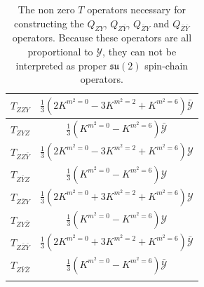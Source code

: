 \begin{table}
%
\begin{center}
%
\begingroup
\setlength{\tabcolsep}{7pt} %
\renewcommand{\arraystretch}{2.0} %
%
\begin{tabular}{ !{\vrule width 1.5pt}c!{\vrule width 1.5pt}c!{\vrule width 1.5pt} }
 	$T_{ZZY}$ & $\frac{1}{3} \left( 2 K^{m^2 = 0} - 3 K^{m^2 = 2} + K^{m^2 = 6} \right) \bar{\mathcal{Y}}$ \\
	\hline 	
 	$T_{ZYZ}$ & $\frac{1}{3} \left( K^{m^2=0} - K^{m^2=6} \right) \bar{\mathcal{Y}}$ \\
 	\hline
 	$T_{ZZ\bar{Y}}$ & $\frac{1}{3} \left( 2 K^{m^2 = 0} - 3 K^{m^2 = 2} + K^{m^2 = 6} \right) \mathcal{Y}$ \\
	\hline 	
 	$T_{Z \bar{Y} Z}$ & $\frac{1}{3} \left( K^{m^2=0} - K^{m^2=6} \right) \mathcal{Y}$ \\
 	\hline
 	$T_{Z\bar{Z}Y}$ & $\frac{1}{3} \left( 2 K^{m^2 = 0} + 3 K^{m^2 = 2} + K^{m^2 = 6} \right) \mathcal{Y}$ \\
	\hline 	
 	$T_{Z Y\bar{Z}}$ & $\frac{1}{3} \left( K^{m^2=0} - K^{m^2=6} \right) \mathcal{Y}$ \\
 	\hline
 	$T_{Z\bar{Z}\bar{Y}}$ & $\frac{1}{3} \left( 2 K^{m^2 = 0} + 3 K^{m^2 = 2} + K^{m^2 = 6} \right) \bar{\mathcal{Y}}$ \\
 	\hline
 	$T_{Z \bar{Y}\bar{Z}}$ & $\frac{1}{3} \left( K^{m^2=0} - K^{m^2=6} \right) \bar{\mathcal{Y}}$ \\
\end{tabular}
%
\endgroup
%
\end{center}
%
\caption[$T$ operators necessary for constructing $Q_{ZY}$, $Q_{Z \bar{Y}}$, $Q_{\bar{Z} Y}$ and $Q_{\bar{Z} \bar{Y}}$]{The non zero $T$ operators necessary for constructing the $Q_{ZY}$, $Q_{Z \bar{Y}}$, $Q_{\bar{Z} Y}$ and $Q_{\bar{Z} \bar{Y}}$ operators. Because these operators are all proportional to $\mathcal{Y}$, they can not be interpreted as proper $\mathfrak{su}(2)$ spin-chain operators.}
%
\label{tab:T-table-5}
%
\end{table}
%
%

